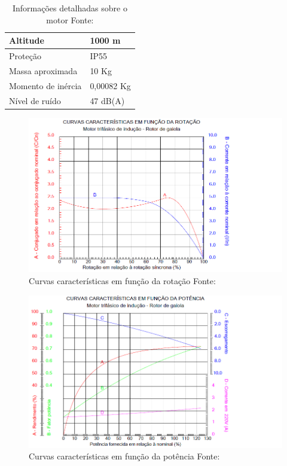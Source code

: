 \begin{table}[H]
\begin{center}
\begin{tabular}{|p{5cm}|p{5cm}|}
                Altitude & 1000 m
                \\ \hline
                Proteção & IP55
                \\ \hline
                Massa aproximada & 10 Kg
                \\ \hline
                Momento de inércia & 0,00082 Kg
                \\ \hline
                Nível de ruído & 47 dB(A)
                \\ \hline
              \end{tabular}
              \caption[Informações detalhadas sobre o motor]{Informações detalhadas sobre o motor
              \protect Fonte:\cite{WEG_catalogo} }
            \label{tabela_info_motor}
        \end{center}
    \end{table}
\newpage

\begin{figure}[H]
\centering
\includegraphics[scale=0.8]{figuras/motor_rota__o.png}
\caption{Curvas características em função da rotação Fonte: \cite{WEG_catalogo} }
\label{fig:motor_rota__o}
\end{figure}

\begin{figure}[H]
\centering
\includegraphics[scale=0.8]{figuras/Motor_potencia.png}
\caption{Curvas características em função da potência Fonte: \cite{WEG_catalogo} }
\label{fig:Motor_potencia}
\end{figure}


